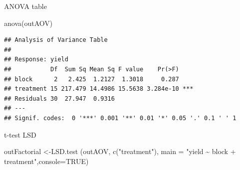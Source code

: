 \documentclass[
]{book}
\newenvironment{Shaded}{\begin{snugshade}}{\end{snugshade}}
\newcommand{\AttributeTok}[1]{\textcolor[rgb]{0.77,0.63,0.00}{#1}}
\newcommand{\ConstantTok}[1]{\textcolor[rgb]{0.00,0.00,0.00}{#1}}
\newcommand{\FunctionTok}[1]{\textcolor[rgb]{0.00,0.00,0.00}{#1}}
\newcommand{\NormalTok}[1]{#1}
\newcommand{\OtherTok}[1]{\textcolor[rgb]{0.56,0.35,0.01}{#1}}
\newcommand{\StringTok}[1]{\textcolor[rgb]{0.31,0.60,0.02}{#1}}
\begin{document}
ANOVA table

\begin{Shaded}
\begin{Highlighting}[]
\FunctionTok{anova}\NormalTok{(outAOV)}
\end{Highlighting}
\end{Shaded}

\begin{verbatim}
## Analysis of Variance Table
## 
## Response: yield
##           Df  Sum Sq Mean Sq F value    Pr(>F)    
## block      2   2.425  1.2127  1.3018     0.287    
## treatment 15 217.479 14.4986 15.5638 3.284e-10 ***
## Residuals 30  27.947  0.9316                      
## ---
## Signif. codes:  0 '***' 0.001 '**' 0.01 '*' 0.05 '.' 0.1 ' ' 1
\end{verbatim}

t-test LSD

\begin{Shaded}
\begin{Highlighting}[]
\NormalTok{outFactorial }\OtherTok{\textless{}{-}}\FunctionTok{LSD.test}\NormalTok{ (outAOV, }\FunctionTok{c}\NormalTok{(}\StringTok{"treatment"}\NormalTok{), }\AttributeTok{main =} \StringTok{"yield \textasciitilde{} block + treatment"}\NormalTok{,}\AttributeTok{console=}\ConstantTok{TRUE}\NormalTok{)}
\end{Highlighting}
\end{Shaded}
\end{document}
